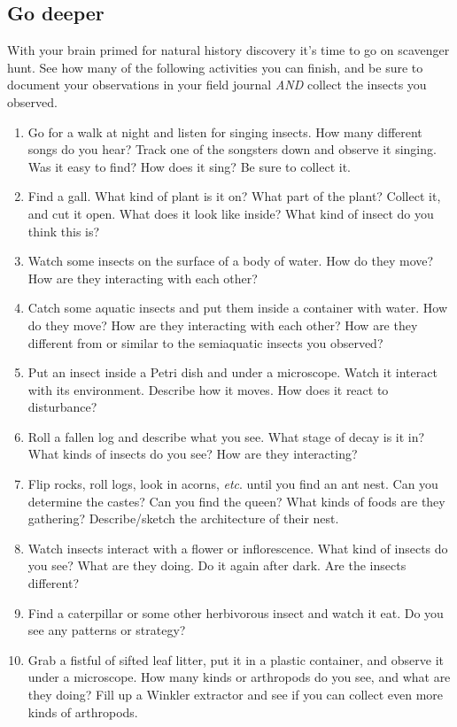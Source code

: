 \documentclass[letterpaper, 11pt]{article}
\begin{document}
\subsection*{Go deeper}
With your brain primed for natural history discovery it's time to go on scavenger hunt. See how many of the following activities you can finish, and be sure to document your observations in your field journal \textit{AND} collect the insects you observed.
\begin{enumerate}
\item Go for a walk at night and listen for singing insects. How many different songs do you hear? Track one of the songsters down and observe it singing. Was it easy to find? How does it sing? Be sure to collect it.
\item Find a gall. What kind of plant is it on? What part of the plant? Collect it, and cut it open. What does it look like inside? What kind of insect do you think this is?
\item Watch some insects on the surface of a body of water. How do they move? How are they interacting with each other?
\item Catch some aquatic insects and put them inside a container with water. How do they move? How are they interacting with each other? How are they different from or similar to the semiaquatic insects you observed?
\item Put an insect inside a Petri dish and under a microscope. Watch it interact with its environment. Describe how it moves. How does it react to disturbance?
\item Roll a fallen log and describe what you see. What stage of decay is it in? What kinds of insects do you see? How are they interacting?
\item Flip rocks, roll logs, look in acorns, \textit{etc}. until you find an ant nest. Can you determine the castes? Can you find the queen? What kinds of foods are they gathering? Describe/sketch the architecture of their nest.
\item Watch insects interact with a flower or inflorescence. What kind of insects do you see? What are they doing. Do it again after dark. Are the insects different?
\item Find a caterpillar or some other herbivorous insect and watch it eat. Do you see any patterns or strategy?
\item Grab a fistful of sifted leaf litter, put it in a plastic container, and observe it under a microscope. How many kinds or arthropods do you see, and what are they doing? Fill up a Winkler extractor and see if you can collect even more kinds of arthropods.
\end{enumerate}
\end{document}
